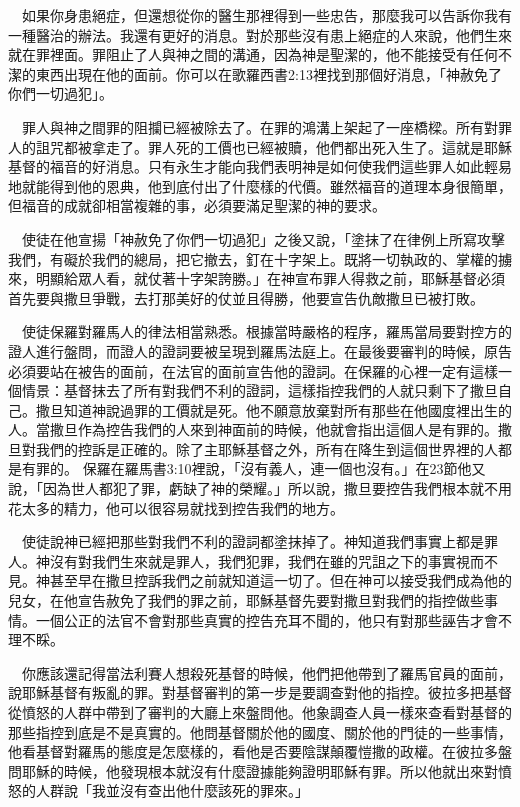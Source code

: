 \documentclass{book}
\begin{document}
　如果你身患絕症，但還想從你的醫生那裡得到一些忠告，那麼我可以告訴你我有一種醫治的辦法。我還有更好的消息。對於那些沒有患上絕症的人來說，他們生來就在罪裡面。罪阻止了人與神之間的溝通，因為神是聖潔的，他不能接受有任何不潔的東西出現在他的面前。你可以在歌羅西書2:13裡找到那個好消息，「神赦免了你們一切過犯」。

　罪人與神之間罪的阻攔已經被除去了。在罪的鴻溝上架起了一座橋樑。所有對罪人的詛咒都被拿走了。罪人死的工價也已經被贖，他們都出死入生了。這就是耶穌基督的福音的好消息。只有永生才能向我們表明神是如何使我們這些罪人如此輕易地就能得到他的恩典，他到底付出了什麼樣的代價。雖然福音的道理本身很簡單，但福音的成就卻相當複雜的事，必須要滿足聖潔的神的要求。

　使徒在他宣揚「神赦免了你們一切過犯」之後又說，「塗抹了在律例上所寫攻擊我們，有礙於我們的總局，把它撤去，釘在十字架上。既將一切執政的、掌權的擄來，明顯給眾人看，就仗著十字架誇勝。」在神宣布罪人得救之前，耶穌基督必須首先要與撒旦爭戰，去打那美好的仗並且得勝，他要宣告仇敵撒旦已被打敗。

　使徒保羅對羅馬人的律法相當熟悉。根據當時嚴格的程序，羅馬當局要對控方的證人進行盤問，而證人的證詞要被呈現到羅馬法庭上。在最後要審判的時候，原告必須要站在被告的面前，在法官的面前宣告他的證詞。在保羅的心裡一定有這樣一個情景：基督抹去了所有對我們不利的證詞，這樣指控我們的人就只剩下了撒旦自己。撒旦知道神說過罪的工價就是死。他不願意放棄對所有那些在他國度裡出生的人。當撒旦作為控告我們的人來到神面前的時候，他就會指出這個人是有罪的。撒旦對我們的控訴是正確的。除了主耶穌基督之外，所有在降生到這個世界裡的人都是有罪的。 保羅在羅馬書3:10裡說，「沒有義人，連一個也沒有。」在23節他又說，「因為世人都犯了罪，虧缺了神的榮耀。」所以說，撒旦要控告我們根本就不用花太多的精力，他可以很容易就找到控告我們的地方。

　使徒說神已經把那些對我們不利的證詞都塗抹掉了。神知道我們事實上都是罪人。神沒有對我們生來就是罪人，我們犯罪，我們在雖的咒詛之下的事實視而不見。神甚至早在撒旦控訴我們之前就知道這一切了。但在神可以接受我們成為他的兒女，在他宣告赦免了我們的罪之前，耶穌基督先要對撒旦對我們的指控做些事情。一個公正的法官不會對那些真實的控告充耳不聞的，他只有對那些誣告才會不理不睬。

　你應該還記得當法利賽人想殺死基督的時候，他們把他帶到了羅馬官員的面前，說耶穌基督有叛亂的罪。對基督審判的第一步是要調查對他的指控。彼拉多把基督從憤怒的人群中帶到了審判的大廳上來盤問他。他象調查人員一樣來查看對基督的那些指控到底是不是真實的。他問基督關於他的國度、關於他的門徒的一些事情，他看基督對羅馬的態度是怎麼樣的，看他是否要陰謀顛覆愷撒的政權。在彼拉多盤問耶穌的時候，他發現根本就沒有什麼證據能夠證明耶穌有罪。所以他就出來對憤怒的人群說「我並沒有查出他什麼該死的罪來。」
\end{document}

